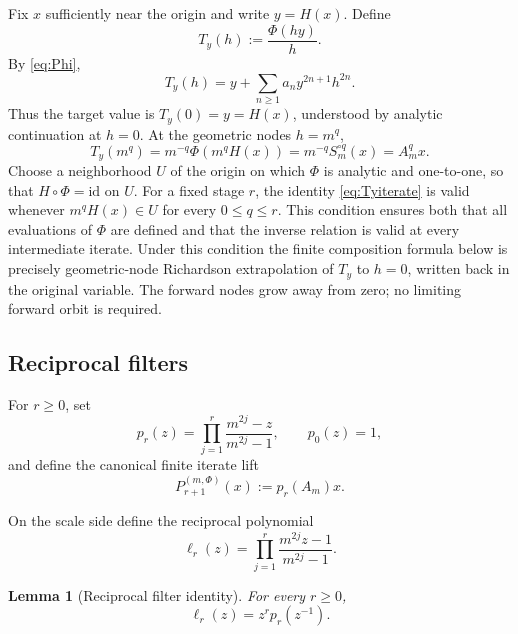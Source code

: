 \documentclass[11pt]{article}
\newtheorem{lemma}[theorem]{Lemma}
\theoremstyle{remark}
\begin{document}
Fix \(x\) sufficiently near the origin and write \(y=H(x)\).  Define
\begin{equation}
T_y(h):=\frac{\Phi(hy)}{h}.
\label{eq:Ty}
\end{equation}
By \eqref{eq:Phi},
\begin{equation}
T_y(h)
=
y+\sum_{n\ge1}a_n y^{2n+1}h^{2n}.
\label{eq:Tyexp}
\end{equation}
Thus the target value is \(T_y(0)=y=H(x)\), understood by analytic
continuation at \(h=0\).  At the geometric nodes \(h=m^q\),
\begin{equation}
\boxed{
T_y(m^q)
=
m^{-q}\Phi(m^qH(x))
=
m^{-q}S_m^{\circ q}(x)
=
A_m^q x.
}
\label{eq:Tyiterate}
\end{equation}
Choose a neighborhood \(U\) of the origin on which \(\Phi\) is analytic
and one-to-one, so that \(H\circ\Phi=\mathrm{id}\) on \(U\).  For a fixed
stage \(r\), the identity \eqref{eq:Tyiterate} is valid whenever
\(m^qH(x)\in U\) for every \(0\le q\le r\).  This condition ensures both
that all evaluations of \(\Phi\) are defined and that the inverse relation is
valid at every intermediate iterate.  Under this condition the finite
composition formula below is precisely geometric-node Richardson
extrapolation of \(T_y\) to \(h=0\), written back in the original variable.
The forward nodes grow away from zero; no limiting forward orbit is required.

\subsection{Reciprocal filters}

For \(r\ge0\), set
\begin{equation}
p_r(z)
=
\prod_{j=1}^r\frac{m^{2j}-z}{m^{2j}-1},
\qquad p_0(z)=1,
\label{eq:pr}
\end{equation}
and define the canonical finite iterate lift
\begin{equation}
P_{r+1}^{(m,\Phi)}(x)
:=
p_r(A_m)x.
\label{eq:Pdef}
\end{equation}

On the scale side define the reciprocal polynomial
\begin{equation}
\ell_r(z)
=
\prod_{j=1}^r\frac{m^{2j}z-1}{m^{2j}-1}.
\label{eq:ellr}
\end{equation}

\begin{lemma}[Reciprocal filter identity]
\label{lem:reciprocal}
For every \(r\ge0\),
\begin{equation}
\boxed{
\ell_r(z)=z^r p_r(z^{-1}).
}
\label{eq:reciprocal}
\end{equation}
\end{lemma}
\end{document}
